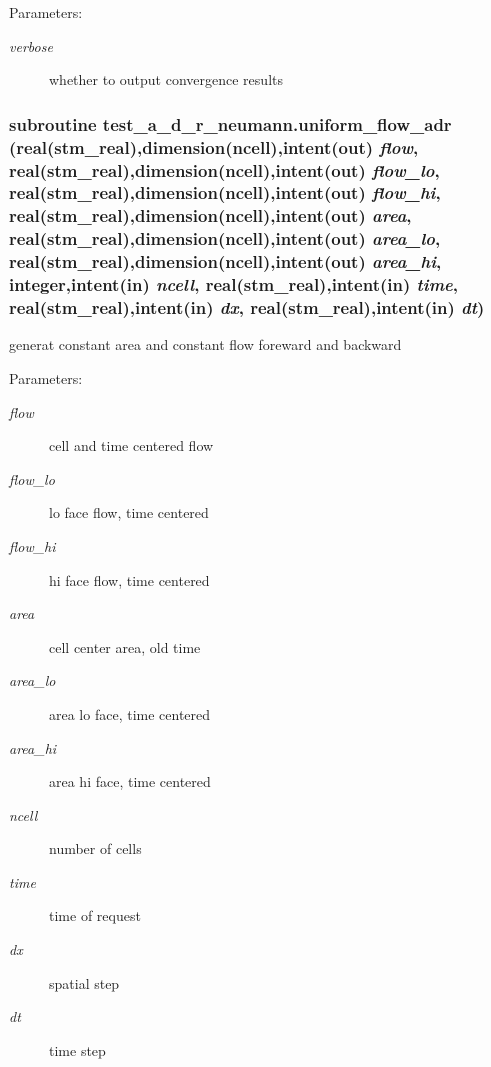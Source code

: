 \begin{Desc}
\item[Parameters:]
\begin{description}
\item[{\em verbose}]whether to output convergence results \end{description}
\end{Desc}
\hypertarget{a00073_4b815140b3893ced6a09ae8dcd52f86b}{
\subsubsection[{uniform\_\-flow\_\-adr}]{\setlength{\rightskip}{0pt plus 5cm}subroutine test\_\-a\_\-d\_\-r\_\-neumann.uniform\_\-flow\_\-adr (real(stm\_\-real),dimension(ncell),intent(out) {\em flow}, \/  real(stm\_\-real),dimension(ncell),intent(out) {\em flow\_\-lo}, \/  real(stm\_\-real),dimension(ncell),intent(out) {\em flow\_\-hi}, \/  real(stm\_\-real),dimension(ncell),intent(out) {\em area}, \/  real(stm\_\-real),dimension(ncell),intent(out) {\em area\_\-lo}, \/  real(stm\_\-real),dimension(ncell),intent(out) {\em area\_\-hi}, \/  integer,intent(in) {\em ncell}, \/  real(stm\_\-real),intent(in) {\em time}, \/  real(stm\_\-real),intent(in) {\em dx}, \/  real(stm\_\-real),intent(in) {\em dt})}}
\label{a00073_4b815140b3893ced6a09ae8dcd52f86b}


generat constant area and constant flow foreward and backward 

\begin{Desc}
\item[Parameters:]
\begin{description}
\item[{\em flow}]cell and time centered flow\item[{\em flow\_\-lo}]lo face flow, time centered\item[{\em flow\_\-hi}]hi face flow, time centered\item[{\em area}]cell center area, old time\item[{\em area\_\-lo}]area lo face, time centered\item[{\em area\_\-hi}]area hi face, time centered\item[{\em ncell}]number of cells\item[{\em time}]time of request\item[{\em dx}]spatial step\item[{\em dt}]time step \end{description}
\end{Desc}
